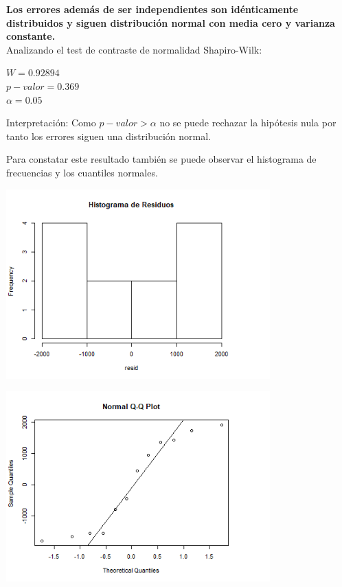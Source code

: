\documentclass[12pt,a4paper]{article}
\begin{document}
	\textbf{Los errores además de ser independientes son idénticamente distribuidos y siguen distribución normal con media cero y varianza constante.}\\
	Analizando el test de contraste de normalidad Shapiro-Wilk:
	\begin{center}
		$W = 0.92894$ \\
		$p-valor = 0.369$\\
		$\alpha = 0.05$
	\end{center}
	Interpretación: Como $p-valor > \alpha$ no se puede rechazar la hipótesis nula por tanto los errores siguen una distribución normal.
	
	Para constatar este resultado también se puede observar el histograma de frecuencias y los cuantiles normales.
	
	\begin{center}
		\includegraphics[width=4in]{./images/HR1.png}
	\end{center}
	
	\begin{center}
		\includegraphics[width=4in]{./images/QQPLOT1.png}
	\end{center}
	
\end{document}
